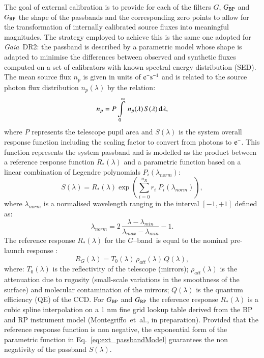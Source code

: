 \documentclass{aa}
\newcommand{\gaia}{\textit{Gaia}\xspace}
\newcommand{\gband}{$G$--band\xspace}
\newcommand{\gbp}{\ensuremath{G_{\rm BP}}\xspace}
\newcommand{\grp}{\ensuremath{G_{\rm RP}}\xspace}
\newcommand{\drt}{\gaia~DR2\xspace}
\newcommand{\xp}{BP and RP\xspace}
\newcommand{\citeipt}[1]{#1~et~al., in preparation\xspace}
\newcommand{\citeipp}[1]{(\citeipt{#1})\xspace}
\newcommand{\equref}[1]{Eq.~\ref{eq:#1}}
\begin{document}
The goal of external calibration is to provide for each of the filters $G$, \gbp and \grp the shape of the passbands and the corresponding zero points to allow for the transformation of internally calibrated source fluxes into meaningful magnitudes. The strategy employed to achieve this is the same one adopted for \drt: the passband is described by a parametric model whose shape is adapted to minimise the differences between observed and synthetic fluxes computed on a set of calibrators with known spectral energy distribution (SED). The mean source flux $n_p$ is given in units of ${\rm e}^- {\rm s}^{-1}$ and is related to the source photon flux distribution $n_p(\lambda)$ by the relation:
\begin{equation}
\label{ext_meanflux}
n_p = P \int\limits_0^\infty \, n_p(\lambda)\, S(\lambda) \, {\rm d}\lambda,
\end{equation}
where $P$ represents the telescope pupil area and $S(\lambda)$ is the system overall response function including the scaling factor to convert from photons to ${\rm e}^{-}$.
This function represents the system passband and is modelled as the product between a reference response function $R_*(\lambda)$ and a parametric function based on a linear combination of Legendre polynomials $P_i(\lambda_{norm})$:
\begin{equation}
\label{eq:ext_passbandModel}
S(\lambda) = R_*(\lambda) \exp\left(\sum_{i=0}^{n_R} r_i \;P_i(\lambda_{norm})\right),
\end{equation}
where $\lambda_{norm}$ is a normalised wavelength ranging in the interval $[-1, +1]$ defined as:
\begin{equation}
\label{ext_normwavelength}
\lambda_{norm} = 2 \, \frac{\lambda - \lambda_{min}}{\lambda_{max}-\lambda_{min}} - 1.
\end{equation}
The reference response $R_*(\lambda)$ for the \gband\ is equal to the nominal pre-launch response \citep{CARME}:
\begin{equation}
\label{ext_rnominal}
R_{G}(\lambda) = T_0(\lambda)\, \rho_{att}(\lambda) \,Q(\lambda),
\end{equation}
where: $T_0(\lambda)$ is the reflectivity of the telescope (mirrors); $\rho_{att}(\lambda)$ is the attenuation due to rugosity (small-scale variations in the smoothness of the surface) and molecular contamination of the mirrors; $Q(\lambda)$ is the quantum efficiency (QE) of the CCD. 
%
For \gbp and \grp the reference response $R_*(\lambda)$ is a cubic spline interpolation on a 1 nm fine grid lookup table derived from the \xp instrument model \citeipp{Montegriffo}. Provided that the reference response function is non negative, the exponential form of the parametric function in \equref{ext_passbandModel} guarantees the non negativity of the passband $S(\lambda)$.
\end{document}
